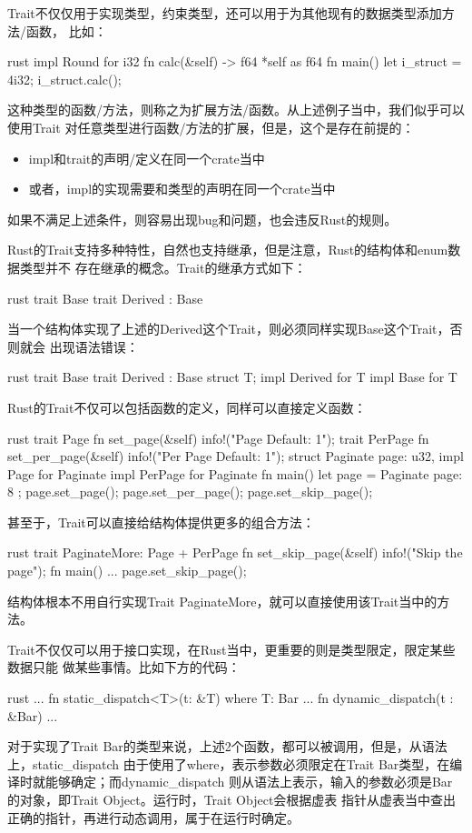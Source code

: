 Trait不仅仅用于实现类型，约束类型，还可以用于为其他现有的数据类型添加方法/函数，
比如：
\begin{code-block}{rust}
impl Round for i32 {
    fn calc(&self) -> f64 {
        *self as f64
    }
}
fn main() {
    let i_struct = 4i32;
    i_struct.calc();
}
\end{code-block}
这种类型的函数/方法，则称之为扩展方法/函数。从上述例子当中，我们似乎可以使用Trait
对任意类型进行函数/方法的扩展，但是，这个是存在前提的：
\begin{itemize}
  \item impl和trait的声明/定义在同一个crate当中
  \item 或者，impl的实现需要和类型的声明在同一个crate当中
\end{itemize}
如果不满足上述条件，则容易出现bug和问题，也会违反Rust的规则。

Rust的Trait支持多种特性，自然也支持继承，但是注意，Rust的结构体和enum数据类型并不
存在继承的概念。Trait的继承方式如下：
\begin{code-block}{rust}
trait Base {}
trait Derived : Base {}
\end{code-block}
当一个结构体实现了上述的Derived这个Trait，则必须同样实现Base这个Trait，否则就会
出现语法错误：
\begin{code-block}{rust}
trait Base {}
trait Derived : Base {}
struct T;
impl Derived for T {}
impl Base for T {}
\end{code-block}

Rust的Trait不仅可以包括函数的定义，同样可以直接定义函数：
\begin{code-block}{rust}
trait Page {
    fn set_page(&self) {
        info!("Page Default: 1");
    }
}
trait PerPage {
    fn set_per_page(&self) {
        info!("Per Page Default: 1");
    }
}
struct Paginate {
    page: u32,
}
impl Page for Paginate {}
impl PerPage for Paginate {}
fn main() {
    let page = Paginate { page: 8 };
    page.set_page();
    page.set_per_page();
    page.set_skip_page();
}
\end{code-block}

甚至于，Trait可以直接给结构体提供更多的组合方法：
\begin{code-block}{rust}
trait PaginateMore: Page + PerPage {
    fn set_skip_page(&self) {
        info!("Skip the page");
    }
}
fn main() {
    ...
    page.set_skip_page();
}
\end{code-block}
结构体根本不用自行实现Trait PaginateMore，就可以直接使用该Trait当中的方法。

Trait不仅仅可以用于接口实现，在Rust当中，更重要的则是类型限定，限定某些数据只能
做某些事情。比如下方的代码：
\begin{code-block}{rust}
...
fn static_dispatch<T>(t: &T) where T: Bar {
    ...
}
fn dynamic_dispatch(t : &Bar) {
    ...
}
\end{code-block}
对于实现了Trait Bar的类型来说，上述2个函数，都可以被调用，但是，从语法上，static\_dispatch
由于使用了where，表示参数必须限定在Trait Bar类型，在编译时就能够确定；而dynamic\_dispatch
则从语法上表示，输入的参数必须是Bar的对象，即Trait Object。运行时，Trait Object会根据虚表
指针从虚表当中查出正确的指针，再进行动态调用，属于在运行时确定。

